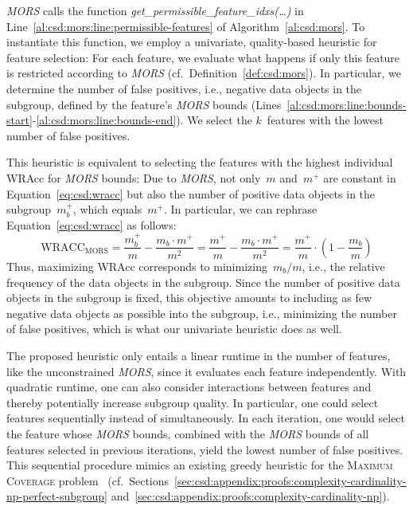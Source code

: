 \documentclass{article}
\theoremstyle{definition}
\begin{document}
\emph{MORS} calls the function \emph{get\_permissible\_feature\_idxs(\dots)} in Line~\ref{al:csd:mors:line:permissible-features} of Algorithm~\ref{al:csd:mors}.
To instantiate this function, we employ a univariate, quality-based heuristic for feature selection:
For each feature, we evaluate what happens if only this feature is restricted according to \emph{MORS} (cf.~Definition~\ref{def:csd:mors}).
In particular, we determine the number of false positives, i.e., negative data objects in the subgroup, defined by the feature's \emph{MORS} bounds (Lines~\ref{al:csd:mors:line:bounds-start}-\ref{al:csd:mors:line:bounds-end}).
We select the $k$~features with the lowest number of false positives.

This heuristic is equivalent to selecting the features with the highest individual WRAcc for \emph{MORS} bounds:
Due to \emph{MORS}, not only~$m$ and~$m^+$ are constant in Equation~\ref{eq:csd:wracc} but also the number of positive data objects in the subgroup~$m_b^+$, which equals~$m^+$.
In particular, we can rephrase Equation~\ref{eq:csd:wracc} as follows:
%
\begin{equation}
	\text{WRACC}_{\text{MORS}} = \frac{m_b^+}{m} - \frac{m_b \cdot m^+}{m^2} = \frac{m^+}{m} - \frac{m_b \cdot m^+}{m^2} = \frac{m^+}{m} \cdot \left( 1 - \frac{m_b}{m} \right)
	\label{eq:csd:wracc-mors}
\end{equation}
%
Thus, maximizing WRAcc corresponds to minimizing~$m_b / m$, i.e., the relative frequency of the data objects in the subgroup.
Since the number of positive data objects in the subgroup is fixed, this objective amounts to including as few negative data objects as possible into the subgroup, i.e., minimizing the number of false positives, which is what our univariate heuristic does as well.

The proposed heuristic only entails a linear runtime in the number of features, like the unconstrained \emph{MORS}, since it evaluates each feature independently.
With quadratic runtime, one can also consider interactions between features and thereby potentially increase subgroup quality.
In particular, one could select features sequentially instead of simultaneously.
In each iteration, one would select the feature whose \emph{MORS} bounds, combined with the \emph{MORS} bounds of all features selected in previous iterations, yield the lowest number of false positives.
This sequential procedure mimics an existing greedy heuristic for the \textsc{Maximum Coverage} problem~\cite{chekuri2004maximum} (cf.~Sections~\ref{sec:csd:appendix:proofs:complexity-cardinality-np-perfect-subgroup} and~\ref{sec:csd:appendix:proofs:complexity-cardinality-np}).
\end{document}
